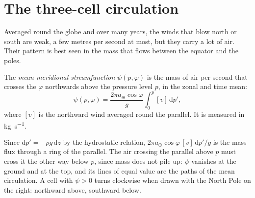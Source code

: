 \section{The three-cell circulation}\label{sec:b1:atmospheric-circulation:cells}

Averaged round the globe and over many years, the winds that blow north or south are
weak, a few metres per second at most, but they carry a lot of air. Their pattern is
best seen in the mass that flows between the equator and the poles.

\begin{definition}\label{def:b1:atmospheric-circulation:streamfunction}
The \emph{mean meridional streamfunction}
$\psi(p, \varphi)$ is the mass of air per second that crosses the 
$\varphi$ northwards above the pressure level $p$, in the zonal and time mean:
\[
  \psi(p, \varphi) = \frac{2\pi a_\oplus\cos\varphi}{g}\int_0^p [v]\,\mathrm dp' ,
\]
where $[v]$ is the northward wind averaged round the parallel. It is measured in
\unit{kg.s^{-1}}.
\end{definition}

Since $\mathrm dp' = -\rho g\,\mathrm dz$ by the hydrostatic relation, $2\pi a_\oplus
\cos\varphi\,[v]\,\mathrm dp'/g$ is the mass flux through a ring of the parallel. The
air crossing the parallel above $p$ must cross it the other way below $p$, since mass
does not pile up: $\psi$ vanishes at the ground and at the top, and its lines of equal
value are the paths of the mean circulation. A cell with $\psi > 0$ turns clockwise
when drawn with the North Pole on the right: northward above, southward below.

